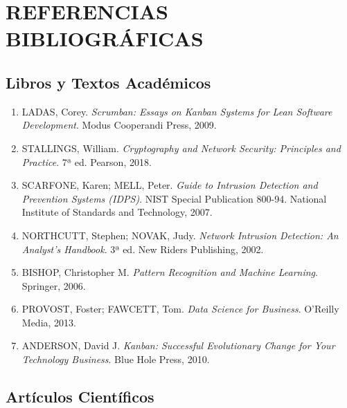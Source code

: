 \documentclass[12pt,letterpaper]{report}
\begin{document}
\chapter{REFERENCIAS BIBLIOGRÁFICAS}

\section*{Libros y Textos Académicos}

\begin{enumerate}[label=\arabic*., ref=\arabic*]
  \item LADAS, Corey. \textit{Scrumban: Essays on Kanban Systems for Lean Software Development}. Modus Cooperandi Press, 2009.
  
  \item STALLINGS, William. \textit{Cryptography and Network Security: Principles and Practice}. 7ª ed. Pearson, 2018.
  
  \item SCARFONE, Karen; MELL, Peter. \textit{Guide to Intrusion Detection and Prevention Systems (IDPS)}. NIST Special Publication 800-94. National Institute of Standards and Technology, 2007.
  
  \item NORTHCUTT, Stephen; NOVAK, Judy. \textit{Network Intrusion Detection: An Analyst's Handbook}. 3ª ed. New Riders Publishing, 2002.
  
  \item BISHOP, Christopher M. \textit{Pattern Recognition and Machine Learning}. Springer, 2006.
  
  \item PROVOST, Foster; FAWCETT, Tom. \textit{Data Science for Business}. O'Reilly Media, 2013.
  
  \item ANDERSON, David J. \textit{Kanban: Successful Evolutionary Change for Your Technology Business}. Blue Hole Press, 2010.
\end{enumerate}

\section*{Artículos Científicos}
\end{document}
